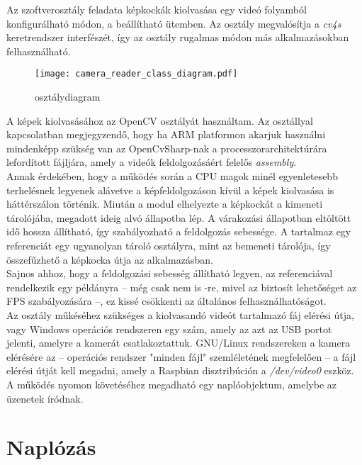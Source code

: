 Az szoftverosztály feladata képkockák kiolvasása egy videó folyamból konfigurálható módon, a beállítható ütemben. Az osztály megvalósítja a \emph{cv4s} keretrendszer  interfészét, így az osztály rugalmas módon más alkalmazásokban felhasználható.
\begin{wrapfigure}{r}{7.5cm}
\texttt{[image: camera\_reader\_class\_diagram.pdf]}
\caption{ osztálydiagram}\label{fig:camera_reader_class_diagram}
\end{wrapfigure} 
A képek kiolvasásához az OpenCV  osztályát használtam. Az osztállyal kapcsolatban megjegyzendő, hogy ha ARM platformon akarjuk használni mindenképp szükség van az OpenCvSharp-nak a processzorarchitektúrára lefordított  fájljára, amely a videók feldolgozásáért felelős \textit{assembly}.\\
Annak érdekében, hogy a működés során a CPU magok minél egyenletesebb terhelésnek legyenek alávetve a képfeldolgozáson kívül a képek kiolvasása is háttérszálon történik. Miután a modul elhelyezte a képkockát a kimeneti tárolójába, megadott ideig alvó állapotba lép. A várakozási állapotban eltöltött idő hossza állítható, így szabályozható a feldolgozás sebessége. A  tartalmaz egy referenciát egy ugyanolyan tároló osztályra, mint az  bemeneti tárolója, így összefűzhető a képkocka útja az alkalmazásban.\\
Sajnos ahhoz, hogy a feldolgozási sebesség állítható legyen, az  referenciával rendelkezik egy  példányra -- még csak nem is -re, mivel az biztosít lehetőséget az FPS szabályozására --, ez kissé csökkenti az általános felhasználhatóságot.\\
Az osztály műkéséhez szükséges a kiolvasandó videót tartalmazó fáj elérési útja, vagy Windows operációs rendszeren egy szám, amely az azt az USB portot jelenti, amelyre a kamerát csatlakoztattuk. GNU/Linux rendszereken a kamera elérésére az -- operációs rendszer "minden fájl" szemléletének megfelelően -- a fájl elérési útját kell megadni, amely a Raspbian disztribúción a \emph{{/dev/video0}} eszköz. A működés nyomon követéséhez megadható egy naplóobjektum, amelybe az üzenetek íródnak.

\section{Naplózás}

